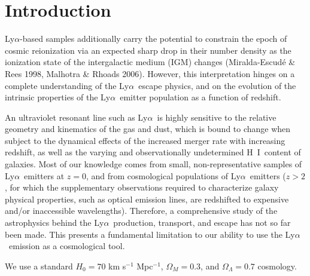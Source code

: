 \documentclass[manuscript]{emulateapj}
\newcommand{\lya}{Ly$\alpha$}
\newcommand{\hi}{H~{\small I}}
\begin{document}
\begin{abstract}
 \end{abstract}



\section{Introduction}

\lya-based samples additionally carry the potential to constrain the
epoch of cosmic reionization via an expected sharp drop in their
number density as the ionization state of the intergalactic medium
(IGM) changes (Miralda-Escud{\'e} \& Rees 1998, Malhotra \& Rhoads
2006). However, this interpretation hinges on a complete understanding
of the \lya\ escape physics, and on the evolution of the intrinsic
properties of the \lya\ emitter population as a function of redshift.

An ultraviolet resonant line such as \lya\ is highly sensitive to the
relative geometry and kinematics of the gas and dust, which is bound
to change when subject to the dynamical effects of the increased
merger rate with increasing redshift, as well as the varying and
observationally undetermined \hi\ content of galaxies. Most of our
knowledge comes from small, non-representative samples of \lya\
emitters at $z=0$, and from cosmological populations of \lya\ emitters
($z>2$, for which the supplementary observations required to
characterize galaxy physical properties, such as optical emission
lines, are redshifted to expensive and/or inaccessible
wavelengths). Therefore, a comprehensive study of the astrophysics
behind the \lya\ production, transport, and escape has not so far been
made. This presents a fundamental limitation to our ability to use the
\lya\ emission as a cosmological tool.
 
We use a standard $H_0 = 70$ km s$^{-1}$ Mpc$^{-1}$, $\Omega_M = 0.3$,
and $\Omega_\Lambda = 0.7$ cosmology.
\end{document}
